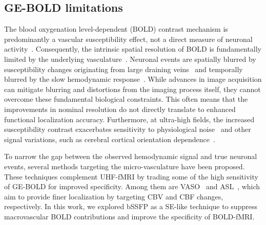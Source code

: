 \subsection{GE-BOLD limitations}
The blood oxygenation level-dependent (\gls{BOLD}) contrast mechanism is predominantly a vascular susceptibility effect, not a direct measure of neuronal activity~\cite{logothetisNeurophysiologicalInvestigationBasis2001}. Consequently, the intrinsic spatial resolution of \gls{BOLD} is fundamentally limited by the underlying vasculature~\cite{duvernoyCorticalBloodVessels1981}. Neuronal events are spatially blurred by susceptibility changes originating from large draining veins~\cite{barthVeryHighresolutionThreedimensional2007,markuerkiagaCorticalVascularModel2016, bauseImpactProspectiveMotion2020} and temporally blurred by the slow hemodynamic response~\cite{sieroBOLDSpecificityDynamics2013}. While advances in image acquisition can mitigate blurring and distortions from the imaging process itself, they cannot overcome these fundamental biological constraints. This often means that the improvements in nominal resolution do not directly translate to enhanced functional localization accuracy. Furthermore, at ultra-high fields, the increased susceptibility contrast exacerbates sensitivity to physiological noise~\cite{triantafyllouPhysiologicalNoiseSignaltonoise2011} and other signal variations, such as cerebral cortical orientation dependence~\cite{viessmannDependenceRestingstateFMRI2019,ramadanMacrovascularContributionsRestingstate2025}.

To narrow the gap between the observed hemodynamic signal and true neuronal events, several methods targeting the micro-vasculature have been proposed. These techniques complement \gls{UHF}-\gls{fMRI} by trading some of the high sensitivity of \gls{GE}-\gls{BOLD} for improved specificity. Among them are \gls{VASO}~\cite{luFunctionalMagneticResonance2003,huberNonBOLDContrastLaminar2019} and \gls{ASL}~\cite{borogovacArterialSpinLabeling2012}, which aim to provide finer localization by targeting \gls{CBV} and \gls{CBF} changes, respectively. In this work, we explored \gls{bSSFP} as a \gls{SE}-like technique to suppress macrovascular \gls{BOLD} contributions and improve the specificity of \gls{BOLD}-\gls{fMRI}.

